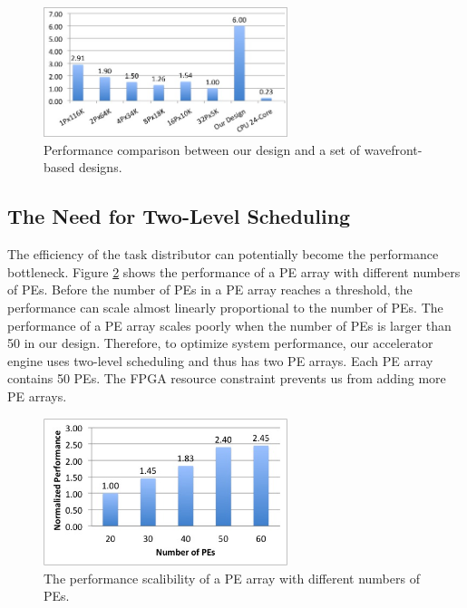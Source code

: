 \begin{figure}[!hbt]
	\begin{center}
		\includegraphics[width=2.8in]{Figures/F2C5.jpg}
		\caption {Performance comparison between our design and a set of wavefront-based designs.}
		\label{fig:F2C5}
	\end{center}
\end{figure}

\subsection{The Need for Two-Level Scheduling}


The efficiency of the task distributor can potentially become the performance bottleneck.
Figure \ref{fig:F3C5} shows the performance of a PE array with different numbers of PEs.
Before the number of PEs in a PE array reaches a threshold,
the performance can scale almost linearly proportional to the number of PEs.
The performance of a PE array scales poorly when the number of PEs is larger than 50 in our design.
Therefore, to optimize system performance, our accelerator engine uses two-level scheduling and thus has two PE arrays. 
Each PE array contains 50 PEs. The FPGA resource constraint prevents us from adding more PE arrays.

\begin{figure}[!hbt]
	\begin{center}
		\includegraphics[width=2.8in]{Figures/F3C5.jpg}
		\caption {The performance scalibility of a PE array with different numbers of PEs.}
		\label{fig:F3C5}
	\end{center}
\end{figure}

